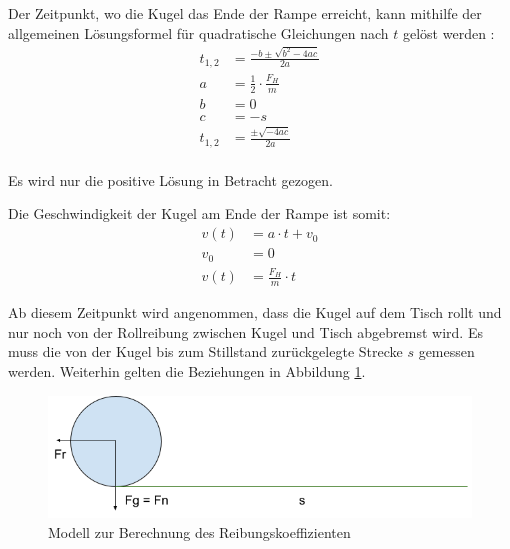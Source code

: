 Der Zeitpunkt, wo die Kugel das Ende der Rampe erreicht, kann mithilfe der allgemeinen Lösungsformel für quadratische Gleichungen nach $t$ gelöst werden \cite{wiki.mitternachtsformel:1}:
\begin{align}
    t_{1,2} &= \frac{-b \pm \sqrt{b^2 - 4ac}}{2a}\\
    a &= \frac{1}{2} \cdot \frac{F_H}{m}\\
    b &= 0\\
    c &= -s\\
    t_{1,2} &= \frac{\pm \sqrt{-4ac}}{2a}\\
\end{align}

Es wird nur die positive Lösung in Betracht gezogen.

Die Geschwindigkeit der Kugel am Ende der Rampe ist somit:
\begin{align}
    v(t) &= a \cdot t + v_0\\
    v_0 &= 0\\
    v(t) &= \frac{F_H}{m} \cdot t
\end{align}

Ab diesem Zeitpunkt wird angenommen, dass die Kugel auf dem Tisch rollt und nur noch von der Rollreibung zwischen Kugel und Tisch abgebremst wird.
Es muss die von der Kugel bis zum Stillstand zurückgelegte Strecke $s$ gemessen werden.
Weiterhin gelten die Beziehungen in Abbildung \ref{fig:modell_reibungskoeffizient}.

\begin{figure}[h!]
    \begin{center}
        \includegraphics[width=0.5\linewidth]{../common/07_appendix/resources/01_reibungskoeffizient_tisch.png}
    \end{center}
    \caption{Modell zur Berechnung des Reibungskoeffizienten}
    \label{fig:modell_reibungskoeffizient}
\end{figure}

